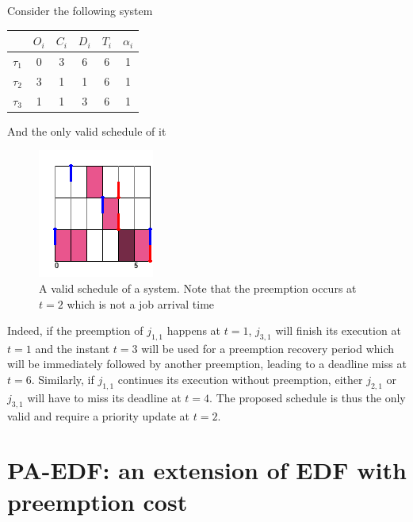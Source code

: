 \documentclass[a4paper,10pt]{article}
\begin{document}
        Consider the following system

        \begin{center}
            \begin{tabular}{|r|c|c|c|c|c|}
                \hline
                            & $O_i$ & $C_i$ & $D_i$ & $T_i$ & $\alpha_i$ \\ \hline
                $\tau_1$    & 0     & 3     & 6    & 6     & 1     \\ \hline
                $\tau_2$    & 3     & 1     & 1    & 6     & 1     \\ \hline
                $\tau_3$    & 1     & 1     & 3    & 6     & 1     \\ \hline
            \end{tabular}
        \end{center}

        And the only valid schedule of it

        \begin{figure}[H]
        \begin{center}
            \includegraphics[scale=0.7]{figs/mpana.png}
            \caption{A valid schedule of a system. Note that the preemption occurs at $t=2$ which is not a job arrival time}
            \label{fig:mpana}
        \end{center}
        \end{figure}

        Indeed, if the preemption of $j_{1,1}$ happens at $t=1$, $j_{3,1}$ will finish its execution at $t=1$ and the instant $t=3$ will be used for a preemption recovery period which will be immediately followed by another preemption, leading to a deadline miss at $t=6$. Similarly, if $j_{1,1}$ continues its execution without preemption, either $j_{2,1}$ or $j_{3,1}$ will have to miss its deadline at $t=4$. The proposed schedule is thus the only valid and require a priority update at $t=2$.

\section{PA-EDF: an extension of EDF with preemption cost}
\end{document}
